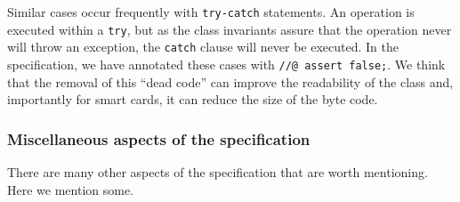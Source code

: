 \documentclass[a4paper]{llncs}
\begin{document}
Similar cases occur frequently with \texttt{try-catch} statements. An
operation is executed within a \texttt{try}, but as the class invariants
assure that the operation never will throw an exception, the
\texttt{catch} clause will never be executed. In the specification, we 
have annotated these cases with \texttt{//@ assert false;}. We think
that the removal of this ``dead code'' can improve the readability of
the class and, importantly for smart cards, it can reduce the 
size of the byte code.


\subsubsection{Miscellaneous aspects of the specification}
There are many other aspects of the specification that are worth
mentioning. Here we mention some.
\end{document}

